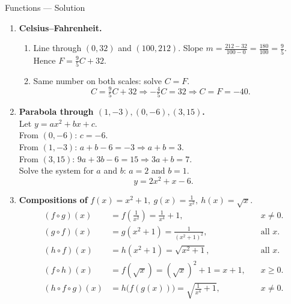 \documentclass[9pt]{beamer}
\begin{document}
\begin{frame}{Functions — Solution}
\footnotesize
\begin{enumerate}[leftmargin=0.5cm, label=(\alph*), rightmargin=0.2cm]

  \item \textbf{Celsius–Fahrenheit.}
  \begin{enumerate}[leftmargin=0.5cm, label=(\roman*), rightmargin=0.2cm]
    \item Line through \((0,32)\) and \((100,212)\).
          Slope \(m=\frac{212-32}{100-0}=\frac{180}{100}=\tfrac{9}{5}\).
          Hence \(\boxed{F=\tfrac{9}{5}C+32}\).
    \item Same number on both scales: solve \(C=F\).
          $$
          C=\tfrac{9}{5}C+32 \Rightarrow -\tfrac{4}{5}C=32 \Rightarrow \boxed{C=F=-40}.
          $$
  \end{enumerate}

  \item \textbf{Parabola through \((1,-3),(0,-6),(3,15)\).} \\
        Let \(y=ax^2+bx+c\). \\
        From \((0,-6)\): \(c=-6\). \\
        From \((1,-3)\): \(a+b-6=-3\Rightarrow a+b=3\).\\
        From \((3,15)\): \(9a+3b-6=15\Rightarrow 3a+b=7\).\\
        Solve the system for $a$ and $b$: $a=2$ and \(b=1\).
        \[
          \boxed{y=2x^2+x-6}.
        \]

  \item \textbf{Compositions of } \(f(x)=x^2+1,\ g(x)=\tfrac{1}{x^2},\ h(x)=\sqrt{x}\).
        \[
        \begin{aligned}
          (f\circ g)(x) &= f\!\left(\tfrac{1}{x^2}\right)=\tfrac{1}{x^4}+1, \quad &x\neq0.\\
          (g\circ f)(x) &= g(x^2+1)=\tfrac{1}{(x^2+1)^2}, \quad &\text{all }x.\\
          (h\circ f)(x) &= h(x^2+1)=\sqrt{x^2+1}, \quad &\text{all }x.\\
          (f\circ h)(x) &= f(\sqrt{x})=(\sqrt{x})^2+1=x+1, \quad &x\ge 0.\\
          (h\circ f\circ g)(x) &= h\!\bigl(f(g(x))\bigr)=\sqrt{\tfrac{1}{x^4}+1}, \quad &x\neq0.
        \end{aligned}
        \]
\end{enumerate}
\end{frame}
\end{document}

